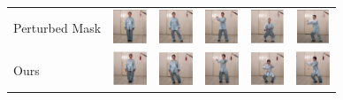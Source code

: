 \documentclass{article}
\begin{document}
\begin{table}[t]
\begin{center}
\begin{small}
\begin{sc}
\begin{tabular}{m{1.0cm}m{1.0cm}m{1.0cm}m{1.0cm}m{1.0cm}m{1.0cm}}
Perturbed Mask & \includegraphics[width=1cm, height=1cm]{images/4_YOAV_1.JPG} &
\includegraphics[width=1cm, height=1cm]{images/4_YOAV_2.JPG} &
\includegraphics[width=1cm, height=1cm]{images/4_YOAV_3.JPG} &
\includegraphics[width=1cm, height=1cm]{images/4_YOAV_4.JPG} &
\includegraphics[width=1cm, height=1cm]{images/4_YOAV_5.JPG} \\
Ours & \includegraphics[width=1cm, height=1cm]{images/5_OURS_1.JPG} &
\includegraphics[width=1cm, height=1cm]{images/5_OURS_2.JPG} &
\includegraphics[width=1cm, height=1cm]{images/5_OURS_3.JPG} &
\includegraphics[width=1cm, height=1cm]{images/5_OURS_4.JPG} &
\includegraphics[width=1cm, height=1cm]{images/5_OURS_5.JPG} \\
\bottomrule
\end{tabular}
\end{sc}
\end{small}
\end{center}
\vskip -0.1in
\end{table}
\end{document}
